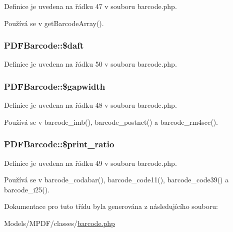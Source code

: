 Definice je uvedena na řádku 47 v souboru barcode.\-php.



Používá se v get\-Barcode\-Array().

\hypertarget{class_p_d_f_barcode_a2e2466cd3f9c0f8a3a2930173b8cb3c1}{
\subsubsection[{\$daft}]{\setlength{\rightskip}{0pt plus 5cm}P\-D\-F\-Barcode\-::\$daft\hspace{0.3cm}{\ttfamily [protected]}}}\label{class_p_d_f_barcode_a2e2466cd3f9c0f8a3a2930173b8cb3c1}


Definice je uvedena na řádku 50 v souboru barcode.\-php.

\hypertarget{class_p_d_f_barcode_a79ea969bd740650de0ea9b910c463dd5}{
\subsubsection[{\$gapwidth}]{\setlength{\rightskip}{0pt plus 5cm}P\-D\-F\-Barcode\-::\$gapwidth\hspace{0.3cm}{\ttfamily [protected]}}}\label{class_p_d_f_barcode_a79ea969bd740650de0ea9b910c463dd5}


Definice je uvedena na řádku 48 v souboru barcode.\-php.



Používá se v barcode\-\_\-imb(), barcode\-\_\-postnet() a barcode\-\_\-rm4scc().

\hypertarget{class_p_d_f_barcode_a06ab6aded68c4acd2d2846a2d9d8beb2}{
\subsubsection[{\$print\-\_\-ratio}]{\setlength{\rightskip}{0pt plus 5cm}P\-D\-F\-Barcode\-::\$print\-\_\-ratio\hspace{0.3cm}{\ttfamily [protected]}}}\label{class_p_d_f_barcode_a06ab6aded68c4acd2d2846a2d9d8beb2}


Definice je uvedena na řádku 49 v souboru barcode.\-php.



Používá se v barcode\-\_\-codabar(), barcode\-\_\-code11(), barcode\-\_\-code39() a barcode\-\_\-i25().



Dokumentace pro tuto třídu byla generována z následujícího souboru\-:\begin{DoxyCompactItemize}
\item 
Models/\-M\-P\-D\-F/classes/\hyperlink{barcode_8php}{barcode.\-php}\end{DoxyCompactItemize}
